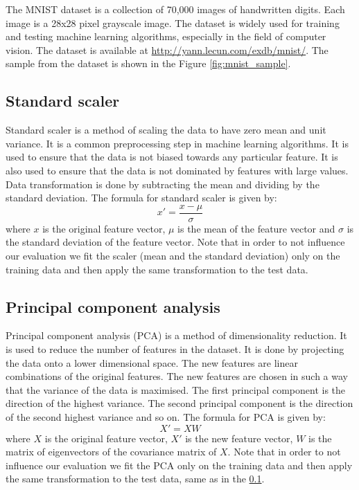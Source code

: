 \documentclass{article}
\begin{document}
The MNIST dataset is a collection of 70,000 images of handwritten digits. Each image is a 28x28 pixel grayscale image. The dataset is widely used for training and testing machine learning algorithms, especially in the field of computer vision. The dataset is available at \url{http://yann.lecun.com/exdb/mnist/}. The sample from the dataset is shown in the Figure \ref{fig:mnist_sample}.

\subsection{Standard scaler}
\label{subsec:standard_scaler}
Standard scaler is a method of scaling the data to have zero mean and unit variance. It is a common preprocessing step in machine learning algorithms. It is used to ensure that the data is not biased towards any particular feature. It is also used to ensure that the data is not dominated by features with large values. Data transformation is done by subtracting the mean and dividing by the standard deviation. The formula for standard scaler is given by:
\begin{equation}
    x' = \frac{x - \mu}{\sigma}
\end{equation}
where $x$ is the original feature vector, $\mu$ is the mean of the feature vector and $\sigma$ is the standard deviation of the feature vector. Note that in order to not influence our evaluation we fit the scaler (mean and the standard deviation) only on the training data and then apply the same transformation to the test data.

\subsection{Principal component analysis}
\label{subsec:pca}
Principal component analysis (PCA) is a method of dimensionality reduction. It is used to reduce the number of features in the dataset. It is done by projecting the data onto a lower dimensional space. The new features are linear combinations of the original features. The new features are chosen in such a way that the variance of the data is maximised. The first principal component is the direction of the highest variance. The second principal component is the direction of the second highest variance and so on. The formula for PCA is given by:
\begin{equation}
    X' = XW
\end{equation}
where $X$ is the original feature vector, $X'$ is the new feature vector, $W$ is the matrix of eigenvectors of the covariance matrix of $X$. Note that in order to not influence our evaluation we fit the PCA only on the training data and then apply the same transformation to the test data, same as in the \ref{subsec:standard_scaler}.
\end{document}
